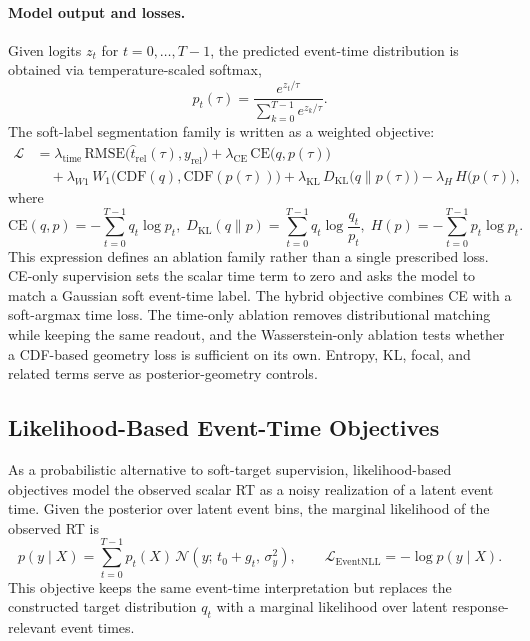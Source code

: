 \documentclass[12pt]{article}
\begin{document}
\paragraph{Model output and losses.}
Given logits $z_t$ for $t=0,\dots,T-1$, the predicted event-time distribution is obtained via temperature-scaled softmax,
\begin{equation}
\label{eq:rt_pred_dist}
p_t(\tau)=\frac{e^{z_t/\tau}}{\sum_{k=0}^{T-1} e^{z_k/\tau}}.
\end{equation}
The soft-label segmentation family is written as a weighted objective:
\begin{equation}
\label{eq:rt_loss}
\begin{aligned}
\mathcal{L}
&= \lambda_{\text{time}}\,\mathrm{RMSE}\big(\hat t_{\mathrm{rel}}(\tau), y_{\mathrm{rel}}\big)
 + \lambda_{\text{CE}}\,\mathrm{CE}\big(q, p(\tau)\big) \\
&\quad + \lambda_{W1}\,W_1\big(\mathrm{CDF}(q), \mathrm{CDF}(p(\tau))\big)
 + \lambda_{\text{KL}}\,D_{\mathrm{KL}}\big(q\|p(\tau)\big)
 - \lambda_{H}\,H\big(p(\tau)\big),
\end{aligned}
\end{equation}
where  
\begin{equation*}
\mathrm{CE}(q,p)=-\sum_{t=0}^{T-1} q_t \log p_t, \;
D_{\mathrm{KL}}(q\|p)=\sum_{t=0}^{T-1} q_t \log\frac{q_t}{p_t}, \;
H(p)=-\sum_{t=0}^{T-1} p_t \log p_t.
\end{equation*}
This expression defines an ablation family rather than a single prescribed loss. CE-only supervision sets the scalar time term to zero and asks the model to match a Gaussian soft event-time label. The hybrid objective combines CE with a soft-argmax time loss. The time-only ablation removes distributional matching while keeping the same readout, and the Wasserstein-only ablation tests whether a CDF-based geometry loss is sufficient on its own. Entropy, KL, focal, and related terms serve as posterior-geometry controls.

\subsection{Likelihood-Based Event-Time Objectives}
\label{sec:event_nll}

As a probabilistic alternative to soft-target supervision, likelihood-based objectives model the observed scalar RT as a noisy realization of a latent event time. Given the posterior over latent event bins, the marginal likelihood of the observed RT is
\begin{equation}
\label{eq:event_nll}
p(y\mid X)
= \sum_{t=0}^{T-1} p_t(X)\,
\mathcal{N}\!\left(y;\,t_0 + g_t,\,\sigma_y^2\right),
\qquad
\mathcal{L}_{\mathrm{EventNLL}} = -\log p(y\mid X).
\end{equation}
This objective keeps the same event-time interpretation but replaces the constructed target distribution $q_t$ with a marginal likelihood over latent response-relevant event times.
\end{document}
